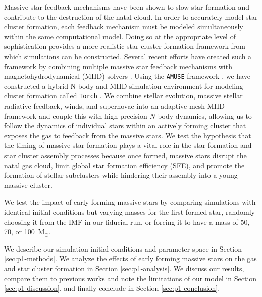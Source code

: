 \documentclass[twoside]{drexel-thesis}
\begin{document}
\begin{thesis}
Massive star feedback mechanisms have been shown to slow star formation and contribute to the destruction of the natal cloud. In order to accurately model star cluster formation, each feedback mechanism must be modeled simultaneously within the same computational model. Doing so at the appropriate level of sophistication provides a more realistic star cluster formation framework from which simulations can be constructed. Several recent efforts have created such a framework by combining multiple massive star feedback mechanisms with magnetohydrodynamical (MHD) solvers  \citep{rogers_feedback_2013, dale_before_2014,lancaster_star_2021,grudic_starforge_2021}. Using the \texttt{AMUSE} framework \citep{portegies_zwart_multiphysics_2009, portegies_zwart_multi-physics_2013, pelupessy_astrophysical_2013, portegies_zwart_astrophysical_2018}, we have constructed a hybrid N-body and MHD simulation environment for modeling cluster formation called \texttt{Torch} \citep{wall_collisional_2019,wall_modeling_2020}. 
We combine stellar evolution, massive stellar radiative feedback, winds, and supernovae into an adaptive mesh MHD framework and couple this with high precision $N$-body dynamics, allowing us to follow the dynamics of individual stars within an actively forming cluster that exposes the gas to feedback from the massive stars. We test the hypothesis that the timing of massive star formation plays a vital role in the star formation and star cluster assembly processes because once formed, massive stars disrupt the natal gas cloud, limit global star formation efficiency (SFE), and promote the formation of stellar subclusters while hindering their assembly into a young massive cluster.

We test the impact of early forming massive stars by comparing simulations with identical initial conditions but varying masses for the first formed star, randomly choosing it from the IMF in our fiducial run, or forcing it to have a mass of 50, 70, or 100~M$_\odot$.

We describe our simulation initial conditions and parameter space in Section \ref{sec:p1-methods}. We analyze the effects of early forming massive stars on the gas and star cluster formation in Section \ref{sec:p1-analysis}. We discuss our results, compare them to previous works and note the limitations of our model in Section \ref{sec:p1-discussion}, and finally conclude in Section \ref{sec:p1-conclusion}. 



\end{thesis}
\end{document}
